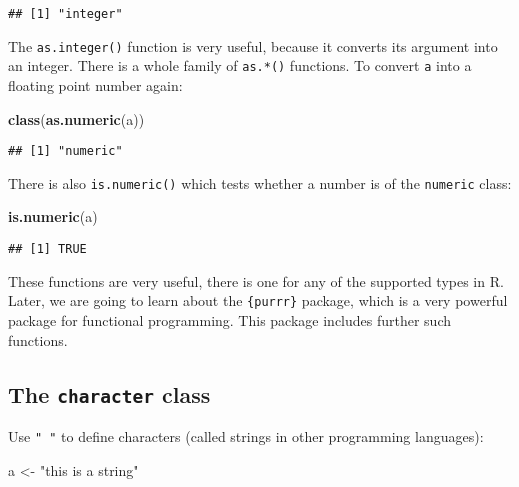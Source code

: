 \documentclass[
]{article}
\newenvironment{Shaded}{\begin{snugshade}}{\end{snugshade}}
\newcommand{\KeywordTok}[1]{\textcolor[rgb]{0.13,0.29,0.53}{\textbf{#1}}}
\newcommand{\NormalTok}[1]{#1}
\newcommand{\StringTok}[1]{\textcolor[rgb]{0.31,0.60,0.02}{#1}}
\begin{document}
\begin{verbatim}
## [1] "integer"
\end{verbatim}

The \texttt{as.integer()} function is very useful, because it converts its argument into an integer. There
is a whole family of \texttt{as.*()} functions. To convert \texttt{a} into a floating point number again:

\begin{Shaded}
\begin{Highlighting}[]
\KeywordTok{class}\NormalTok{(}\KeywordTok{as.numeric}\NormalTok{(a))}
\end{Highlighting}
\end{Shaded}

\begin{verbatim}
## [1] "numeric"
\end{verbatim}

There is also \texttt{is.numeric()} which tests whether a number is of the \texttt{numeric} class:

\begin{Shaded}
\begin{Highlighting}[]
\KeywordTok{is.numeric}\NormalTok{(a)}
\end{Highlighting}
\end{Shaded}

\begin{verbatim}
## [1] TRUE
\end{verbatim}

These functions are very useful, there is one for any of the supported types in R. Later, we are going
to learn about the \texttt{\{purrr\}} package, which is a very powerful package for functional programming. This
package includes further such functions.

\hypertarget{the-character-class}{%
\subsection{\texorpdfstring{The \texttt{character} class}{The character class}}\label{the-character-class}}

Use \texttt{"\ "} to define characters (called strings in other programming languages):

\begin{Shaded}
\begin{Highlighting}[]
\NormalTok{a \textless{}{-}}\StringTok{ "this is a string"}
\end{Highlighting}
\end{Shaded}
\end{document}

